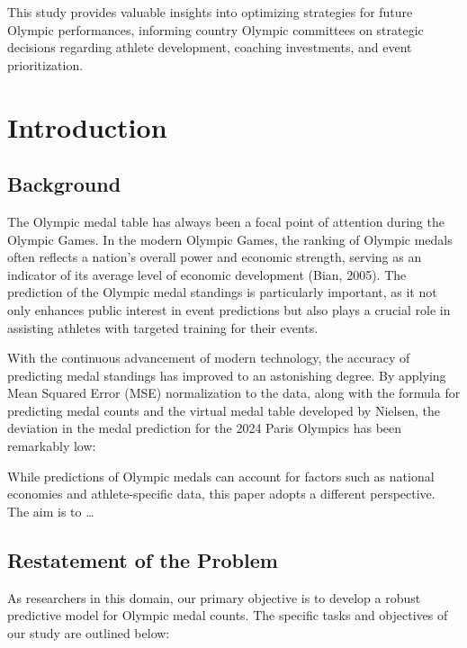 \documentclass[12pt]{article}
\begin{document}
This study provides valuable insights into optimizing strategies for future Olympic performances, informing country Olympic committees on strategic decisions regarding athlete development, coaching investments, and event prioritization.



\clearpage
\pagestyle{fancy}
\tableofcontents


\newpage

\setcounter{page}{1}

\section{Introduction}

\subsection{Background}

The Olympic medal table has always been a focal point of attention during the Olympic Games. In the modern Olympic Games, the ranking of Olympic medals often reflects a nation's overall power and economic strength, serving as an indicator of its average level of economic development (Bian, 2005). The prediction of the Olympic medal standings is particularly important, as it not only enhances public interest in event predictions but also plays a crucial role in assisting athletes with targeted training for their events.

With the continuous advancement of modern technology, the accuracy of predicting medal standings has improved to an astonishing degree. By applying Mean Squared Error (MSE) normalization to the data, along with the formula for predicting medal counts and the virtual medal table developed by Nielsen, the deviation in the medal prediction for the 2024 Paris Olympics has been remarkably low:

While predictions of Olympic medals can account for factors such as national economies and athlete-specific data, this paper adopts a different perspective. The aim is to \ldots


\subsection{Restatement of the Problem}

As researchers in this domain, our primary objective is to develop a robust predictive model for Olympic medal counts. The specific tasks and objectives of our study are outlined below:
\end{document}

